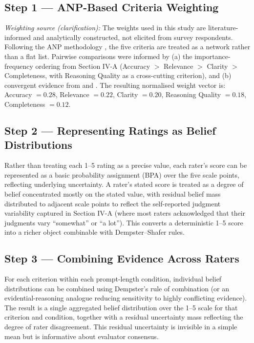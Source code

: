 \documentclass[conference]{IEEEtran}
\begin{document}
\subsection{Step 1 --- ANP-Based Criteria Weighting}
\textit{Weighting source (clarification):} The weights used in this study are literature-informed and analytically constructed, not elicited from survey respondents. Following the ANP methodology \cite{saaty2001}, the five criteria are treated as a network rather than a flat list. Pairwise comparisons were informed by (a) the importance-frequency ordering from Section IV-A (Accuracy $>$ Relevance $>$ Clarity $>$ Completeness, with Reasoning Quality as a cross-cutting criterion), and (b) convergent evidence from \cite{liu2025} and \cite{balaji2024}. The resulting normalised weight vector is: Accuracy $=0.28$, Relevance $=0.22$, Clarity $=0.20$, Reasoning Quality $=0.18$, Completeness $=0.12$.

\subsection{Step 2 --- Representing Ratings as Belief Distributions}
Rather than treating each 1--5 rating as a precise value, each rater's score can be represented as a basic probability assignment (BPA) over the five scale points, reflecting underlying uncertainty. A rater's stated score is treated as a degree of belief concentrated mostly on the stated value, with residual belief mass distributed to adjacent scale points to reflect the self-reported judgment variability captured in Section IV-A (where most raters acknowledged that their judgments vary ``somewhat'' or ``a lot''). This converts a deterministic 1--5 score into a richer object combinable with Dempster--Shafer rules.

\subsection{Step 3 --- Combining Evidence Across Raters}
For each criterion within each prompt-length condition, individual belief distributions can be combined using Dempster's rule of combination (or an evidential-reasoning analogue reducing sensitivity to highly conflicting evidence). The result is a single aggregated belief distribution over the 1--5 scale for that criterion and condition, together with a residual uncertainty mass reflecting the degree of rater disagreement. This residual uncertainty is invisible in a simple mean but is informative about evaluator consensus.
\end{document}
